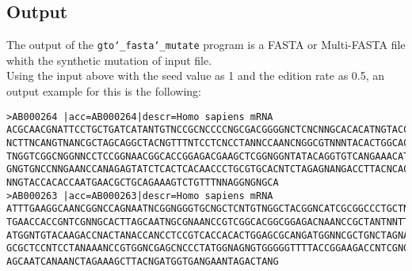\subsection*{Output}
The output of the \texttt{gto\char`_fasta\char`_mutate} program is a FASTA or Multi-FASTA file whith the synthetic mutation of input file.\\
Using the input above with the seed value as 1 and the edition rate as 0.5, an output example for this is the following:
\begin{lstlisting}
>AB000264 |acc=AB000264|descr=Homo sapiens mRNA 
ACGCAACGNATTCCTGCTGATCATANTGTNCCGCNCCCCNGCGACGGGGNCTCNCNNGCACACATNGTACCATTGTCCAC
NCTTNCANGTNANCGCTAGCAGGCTACNGTTTNTCCTCNCCTANNCCAANCNGGCGTNNNTACACTGGCACGTGCAGGCA
TNGGTCGGCNGGNNCCTCCGGNAACGGCACCGGAGACGAAGCTCGGNGGNTATACAGGTGTCANGAAACATCCCCGCGNC
GNGTGNCCNNGAANCCANAGAGTATCTCACTCACAACCCTGCGTGCACNTCTAGAGNANGACCTTACNCACCNTCCCNTT
NNGTACCACACCAATGAACGCTGCAGAAAGTCTGTTTNNAGGNGNGCA
>AB000263 |acc=AB000263|descr=Homo sapiens mRNA 
ATTTGAAGGCAANCGGNCCAGNAATNCGGNGGGTGCNGCTCNTGTNGGCTACGGNCATCGCGGCCCTGCTNTANTAAGCN
TGAACCACCGNTCGNNGCACTTAGCAATNGCGNAANCCGTCGGCACGGCGGAGACNAANCCGCTANTNNTTTCCCGCTNA
ATGGNTGTACAAGACCNACTANACCANCCTCCGTCACCACACTGGAGCGCANGATGGNNCGCTGNCTAGNAGNCNNTGAG
GCGCTCCNTCCTANAAANCCGTGGNCGAGCNCCCTATGGNAGNGTGGGGGTTTTACCGGAAGACCNTCGNGCCCTATGGG
AGCAATCANAANCTAGAAAGCTTACNGATGGTGANGAANTAGACTANG
\end{lstlisting}